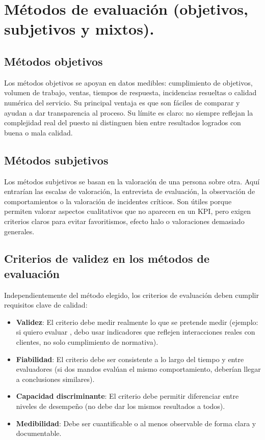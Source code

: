 \section{Métodos de evaluación (objetivos, subjetivos y mixtos).}

\subsection{Métodos objetivos}
Los métodos objetivos se apoyan en datos medibles: cumplimiento de objetivos, volumen de trabajo, ventas, tiempos de respuesta, incidencias resueltas o calidad numérica del servicio. Su principal ventaja es que son fáciles de comparar y ayudan a dar transparencia al proceso. Su límite es claro: no siempre reflejan la complejidad real del puesto ni distinguen bien entre resultados logrados con buena o mala calidad.

\subsection{Métodos subjetivos}
Los métodos subjetivos se basan en la valoración de una persona sobre otra. Aquí entrarían las escalas de valoración, la entrevista de evaluación, la observación de comportamientos o la valoración de incidentes críticos. Son útiles porque permiten valorar aspectos cualitativos que no aparecen en un KPI, pero exigen criterios claros para evitar favoritismos, efecto halo o valoraciones demasiado generales.

\subsection*{Criterios de validez en los métodos de evaluación}
Independientemente del método elegido, los criterios de evaluación deben cumplir requisitos clave de calidad:
\begin{itemize}[leftmargin=*]
	\item \textbf{Validez}: El criterio debe medir realmente lo que se pretende medir (ejemplo: si quiero evaluar , debo usar indicadores que reflejen interacciones reales con clientes, no solo cumplimiento de normativa).
	\item \textbf{Fiabilidad}: El criterio debe ser consistente a lo largo del tiempo y entre evaluadores (si dos mandos evalúan el mismo comportamiento, deberían llegar a conclusiones similares).
	\item \textbf{Capacidad discriminante}: El criterio debe permitir diferenciar entre niveles de desempeño (no debe dar los mismos resultados a todos).
	\item \textbf{Medibilidad}: Debe ser cuantificable o al menos observable de forma clara y documentable.
\end{itemize}

